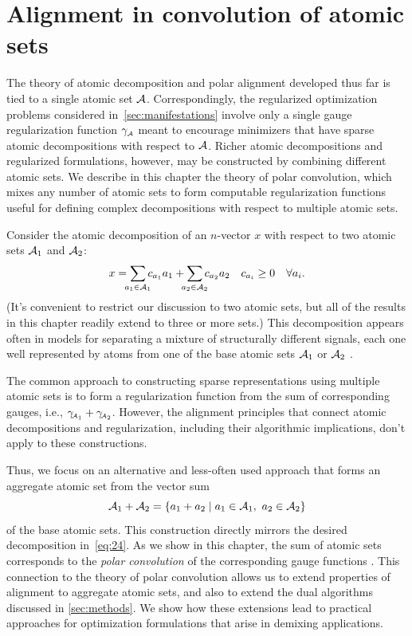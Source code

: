 \section{Alignment in convolution of atomic sets}

The theory of atomic decomposition and polar alignment developed thus far is
tied to a single atomic set $\mathcal{A}$. Correspondingly, the regularized
optimization problems considered in~\autoref{sec:manifestations} involve only a
single gauge regularization function $\gamma_{\scriptscriptstyle\mathcal{A}}$ meant to encourage minimizers
that have sparse atomic decompositions with respect to $\mathcal{A}$.  Richer atomic
decompositions and regularized formulations, however, may be constructed by
combining different atomic sets. We describe in this chapter the theory of polar
convolution, which mixes any number of atomic sets to form computable
regularization functions useful for defining complex decompositions with respect
to multiple atomic sets.

Consider the atomic decomposition of an $n$-vector $x$ with respect to two
atomic sets $\mathcal{A}_1$ and $\mathcal{A}_2$:
\begin{equation} \label{eq:24}
  x =   \sum_{\mathclap{a_1\in\Ascr_1}}c_{a_1}a_1 
      + \sum_{\mathclap{a_2\in\Ascr_2}}c_{a_2}a_2
       \quad c_{a_i}\ge0 \quad \forall a_i.
\end{equation}
(It's convenient to restrict our discussion to two atomic sets, but all of the
results in this chapter readily extend to three or more sets.) This
decomposition appears often in models for separating a mixture of structurally
different signals, each one well represented by atoms from one of the base
atomic sets $\mathcal{A}_1$ or $\mathcal{A}_2$
\citep{wright2009robust,candes2011robust,wright2013compressive,McCoy2014,oymak2017universality,donoho2012sparse}.

The common approach to constructing sparse representations using multiple atomic
sets is to form a regularization function from the sum of corresponding gauges,
i.e., $\gamma_{\!\scriptscriptstyle\mathcal{A}_1}+\gamma_{\!\scriptscriptstyle\mathcal{A}_2}$. However, the alignment principles that connect
atomic decompositions and regularization, including their algorithmic
implications, don't apply to these constructions.

Thus, we focus on an alternative and less-often used approach that forms an
aggregate atomic set from the vector sum
\begin{equation*} \label{eq:23}
  \Ascr_1+\Ascr_2 = \{a_1+a_2 \mid a_1\in\Ascr_1,\ a_2\in\Ascr_2\}
\end{equation*}
of the base atomic sets. This construction directly mirrors the desired
decomposition in~\eqref{eq:24}. As we show in this chapter, the sum of atomic
sets corresponds to the \emph{polar convolution} of the corresponding gauge
functions \cite{friedlander2019polarconvolution}. This connection to the theory of
polar convolution allows us to extend properties of alignment to aggregate
atomic sets, and also to extend the dual algorithms discussed in
\autoref{sec:methods}. We show how these extensions lead to practical approaches
for optimization formulations that arise in demixing applications.

